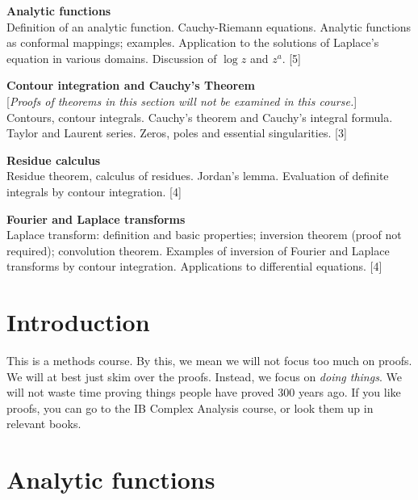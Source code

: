 \documentclass[a4paper]{article}
\begin{document}
\maketitle
{\small
\noindent\textbf{Analytic functions}\\
Definition of an analytic function. Cauchy-Riemann equations. Analytic functions as conformal mappings; examples. Application to the solutions of Laplace's equation in various domains. Discussion of $\log z$ and $z^a$.\hspace*{\fill} [5]

\vspace{10pt}
\noindent\textbf{Contour integration and Cauchy's Theorem}\\
{[}\emph{Proofs of theorems in this section will not be examined in this course.}{]}\\
Contours, contour integrals. Cauchy's theorem and Cauchy's integral formula. Taylor and Laurent series. Zeros, poles and essential singularities.\hspace*{\fill} [3]

\vspace{10pt}
\noindent\textbf{Residue calculus}\\
Residue theorem, calculus of residues. Jordan's lemma. Evaluation of definite integrals by contour integration.\hspace*{\fill} [4]

\vspace{10pt}
\noindent\textbf{Fourier and Laplace transforms}\\
Laplace transform: definition and basic properties; inversion theorem (proof not required); convolution theorem. Examples of inversion of Fourier and Laplace transforms by contour integration. Applications to differential equations.\hspace*{\fill} [4]}

\tableofcontents

\setcounter{section}{-1}
\section{Introduction}
This is a methods course. By this, we mean we will not focus too much on proofs. We will at best just skim over the proofs. Instead, we focus on \emph{doing things}. We will not waste time proving things people have proved 300 years ago. If you like proofs, you can go to the IB Complex Analysis course, or look them up in relevant books.

\section{Analytic functions}
\end{document}
